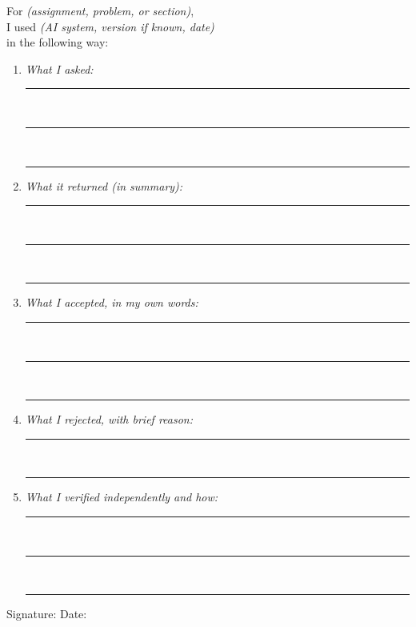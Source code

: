 \documentclass[11pt]{book}
\begin{document}
\medskip

\noindent For \underline{\hspace{6cm}} \emph{(assignment, problem, or section)},\\[0.5em]
I used \underline{\hspace{8cm}} \emph{(AI system, version if known, date)}\\[0.5em]
in the following way:

\medskip

\begin{enumerate}\setlength{\itemsep}{12pt}
\item \emph{What I asked:} \\[0.4em]
\rule{\linewidth}{0.4pt}\\[0.3em]
\rule{\linewidth}{0.4pt}\\[0.3em]
\rule{\linewidth}{0.4pt}

\item \emph{What it returned (in summary):} \\[0.4em]
\rule{\linewidth}{0.4pt}\\[0.3em]
\rule{\linewidth}{0.4pt}\\[0.3em]
\rule{\linewidth}{0.4pt}

\item \emph{What I accepted, in my own words:} \\[0.4em]
\rule{\linewidth}{0.4pt}\\[0.3em]
\rule{\linewidth}{0.4pt}\\[0.3em]
\rule{\linewidth}{0.4pt}

\item \emph{What I rejected, with brief reason:} \\[0.4em]
\rule{\linewidth}{0.4pt}\\[0.3em]
\rule{\linewidth}{0.4pt}

\item \emph{What I verified independently and how:} \\[0.4em]
\rule{\linewidth}{0.4pt}\\[0.3em]
\rule{\linewidth}{0.4pt}\\[0.3em]
\rule{\linewidth}{0.4pt}
\end{enumerate}

\medskip

\noindent Signature: \underline{\hspace{8cm}} \quad Date: \underline{\hspace{4cm}}

\end{document}
